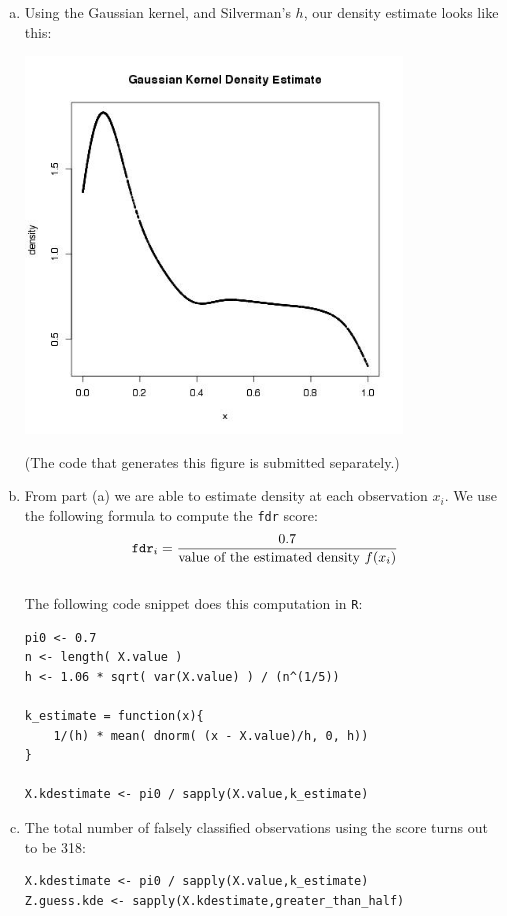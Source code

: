 \documentclass[12pt]{article}
\begin{document}
\begin{enumerate}[(a)]
\item Using the Gaussian kernel, and Silverman's $h$, our density estimate looks like this:

\begin{center}
\includegraphics[width=10cm, height=10cm]{plot_prob2_a}
\end{center} 
(The code that generates this figure is submitted separately.)

\item From part (a) we are able to estimate density at each observation $x_i$. We use the following formula to compute the \texttt{fdr} score:
\\
$$
\text{\texttt{fdr}}_i = \frac{0.7} {\text{value of the estimated density } f(x_i)}
$$
\\
The following code snippet does this computation in \texttt{R}:
\begin{verbatim}
pi0 <- 0.7
n <- length( X.value )
h <- 1.06 * sqrt( var(X.value) ) / (n^(1/5))

k_estimate = function(x){
    1/(h) * mean( dnorm( (x - X.value)/h, 0, h))
}

X.kdestimate <- pi0 / sapply(X.value,k_estimate)
\end{verbatim}

\item The total number of falsely classified observations using the score turns out to be 318:
\begin{verbatim}
X.kdestimate <- pi0 / sapply(X.value,k_estimate)
Z.guess.kde <- sapply(X.kdestimate,greater_than_half)


\end{verbatim}
\end{enumerate}
\end{document}
